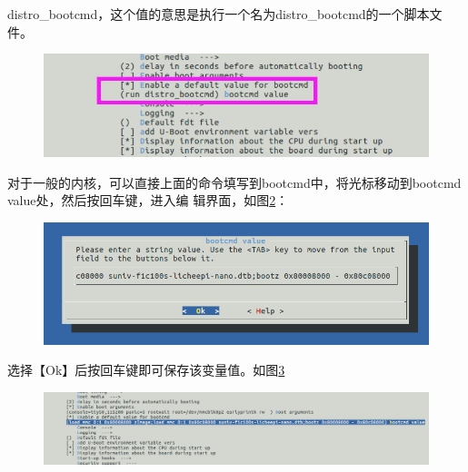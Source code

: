 distro\_bootcmd，这个值的意思是执行一个名为distro\_bootcmd的一个脚本文件。
\begin{figure}[htbp]
	\centering
	\includegraphics[width=1\linewidth]{chapter2/img/bootcmd}
	\caption{}
	\label{fig:bootcmd}
\end{figure}
对于一般的内核，可以直接上面的命令填写到bootcmd中，将光标移动到bootcmd value处，然后按回车键，进入编
辑界面，如图\ref{fig:bootcmdvlaue}：\\
\begin{figure}[htbp]
	\centering
	\includegraphics[width=1\linewidth]{chapter2/img/bootcmdvlaue}
	\caption{}
	\label{fig:bootcmdvlaue}
\end{figure}
选择【Ok】后按回车键即可保存该变量值。如图\ref{fig:bootcmdsave}
\begin{figure}[htbp]
	\centering
	\includegraphics[width=1\linewidth]{chapter2/img/bootcmdsave}
	\caption{}
	\label{fig:bootcmdsave}
\end{figure}



